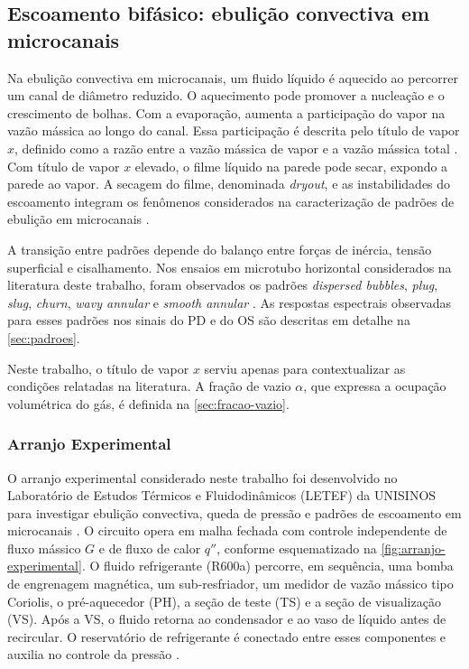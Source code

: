 \subsection{Escoamento bifásico: ebulição convectiva em microcanais}\label{sec:ebolicao}

Na ebulição convectiva em microcanais, um fluido líquido é aquecido ao percorrer um canal
de diâmetro reduzido. O aquecimento pode promover a nucleação e o crescimento de
bolhas. Com a evaporação, aumenta a participação do vapor na vazão mássica
ao longo do canal. Essa participação é descrita pelo título de vapor $x$,
definido como a razão entre a vazão mássica de vapor e a vazão mássica total
\cite{deoliveira2021}.
Com título de vapor $x$ elevado, o filme líquido na parede pode secar, expondo a
parede ao vapor. A secagem do filme, denominada \textit{dryout}, e as instabilidades
do escoamento integram os fenômenos considerados na caracterização de padrões de
ebulição em microcanais \cite{cheng2023}.

A transição entre padrões depende do balanço entre forças de inércia, tensão superficial
e cisalhamento. Nos ensaios em microtubo horizontal considerados na literatura deste
trabalho, foram observados os padrões \textit{dispersed bubbles},
\textit{plug}, \textit{slug}, \textit{churn}, \textit{wavy annular} e \textit{smooth annular}
\cite{deoliveira2021,cheng2023}. As respostas espectrais observadas para esses padrões nos
sinais do PD e do OS são descritas em detalhe na \autoref{sec:padroes}.

Neste trabalho, o título de vapor $x$ serviu apenas para contextualizar as
condições relatadas na literatura. A fração de vazio $\alpha$, que expressa
a ocupação volumétrica do gás, é definida na \autoref{sec:fracao-vazio}.

\subsubsection{Arranjo Experimental}\label{sec:arranjo}

O arranjo experimental considerado neste trabalho foi desenvolvido no Laboratório de Estudos
Térmicos e Fluidodinâmicos (LETEF) da UNISINOS para investigar ebulição convectiva, queda
de pressão e padrões de escoamento em microcanais \cite{deoliveira2019,deoliveira2021}.
O circuito opera em malha fechada com controle independente de fluxo mássico $G$ e de fluxo de
calor $q''$, conforme esquematizado na \autoref{fig:arranjo-experimental}. O fluido refrigerante (R600a)
percorre, em sequência, uma bomba de engrenagem magnética, um sub-resfriador, um medidor de
vazão mássico tipo Coriolis, o pré-aquecedor (PH), a seção de teste (TS) e a seção de
visualização (VS). Após a VS, o fluido retorna ao condensador e ao vaso de líquido
antes de recircular. O reservatório de refrigerante é conectado entre esses componentes
e auxilia no controle da pressão \cite{deoliveira2021}.

